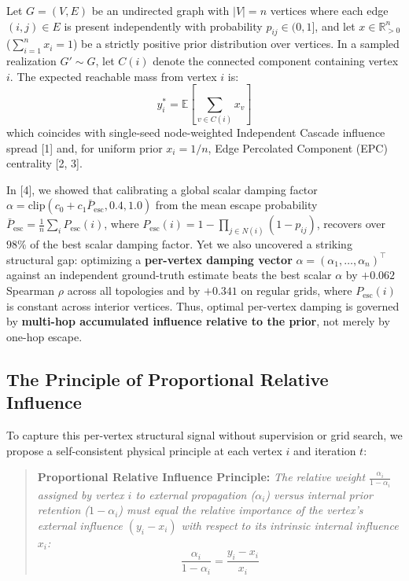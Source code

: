 \documentclass[11pt, a4paper]{article}
\begin{document}
Let $G=(V,E)$ be an undirected graph with $|V|=n$ vertices where each edge $(i,j) \in E$ is present independently with probability $p_{ij} \in (0,1]$, and let $x \in \mathbb{R}^n_{>0}$ ($\sum_{i=1}^n x_i = 1$) be a strictly positive prior distribution over vertices. In a sampled realization $G' \sim G$, let $C(i)$ denote the connected component containing vertex $i$. The expected reachable mass from vertex $i$ is:
\[
y^*_i = \mathbb{E}\!\left[\sum_{v \in C(i)} x_v\right]
\]
which coincides with single-seed node-weighted Independent Cascade influence spread [1] and, for uniform prior $x_i = 1/n$, Edge Percolated Component (EPC) centrality [2, 3].

In [4], we showed that calibrating a global scalar damping factor $\alpha = \mathrm{clip}(c_0 + c_1 \bar{P}_{\mathrm{esc}}, 0.4, 1.0)$ from the mean escape probability $\bar{P}_{\mathrm{esc}} = \frac{1}{n}\sum_i P_{\mathrm{esc}}(i)$, where $P_{\mathrm{esc}}(i) = 1 - \prod_{j \in N(i)}(1 - p_{ij})$, recovers over $98\%$ of the best scalar damping factor. Yet we also uncovered a striking structural gap: optimizing a \textbf{per-vertex damping vector} $\alpha = (\alpha_1, \dots, \alpha_n)^\top$ against an independent ground-truth estimate beats the best scalar $\alpha$ by $+0.062$ Spearman $\rho$ across all topologies and by $+0.341$ on regular grids, where $P_{\mathrm{esc}}(i)$ is constant across interior vertices. Thus, optimal per-vertex damping is governed by \textbf{multi-hop accumulated influence relative to the prior}, not merely by one-hop escape.

\subsection{The Principle of Proportional Relative Influence}

To capture this per-vertex structural signal without supervision or grid search, we propose a self-consistent physical principle at each vertex $i$ and iteration $t$:

\begin{quote}
\textbf{Proportional Relative Influence Principle:} \textit{The relative weight $\frac{\alpha_i}{1 - \alpha_i}$ assigned by vertex $i$ to external propagation ($\alpha_i$) versus internal prior retention ($1 - \alpha_i$) must equal the relative importance of the vertex's external influence $(y_i - x_i)$ with respect to its intrinsic internal influence $x_i$:}
\[
\frac{\alpha_i}{1 - \alpha_i} = \frac{y_i - x_i}{x_i}
\]
\end{quote}
\end{document}
